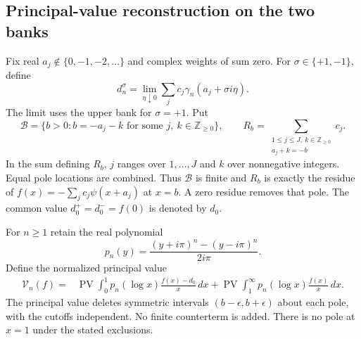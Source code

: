 \subsection{Principal-value reconstruction on the two banks}
Fix real $a_j\notin\{0,-1,-2,\ldots\}$ and complex weights of sum
zero. For $\sigma\in\{+1,-1\}$, define
\[
 d_n^\sigma=\lim_{\eta\downarrow0}\sum_jc_j\gamma_n(a_j+\sigma i\eta).
\]
The limit uses the upper bank for $\sigma=+1$. Put
\[
 \mathcal B=\{b>0:b=-a_j-k\text{ for some }j,\ k\in\mathbb Z_{\ge0}\},
 \qquad R_b=\sum_{\substack{1\le j\le J,\ k\in\mathbb Z_{\ge0}\\a_j+k=-b}}c_j.
\]
In the sum defining $R_b$, $j$ ranges over $1,\ldots,J$ and $k$ over
nonnegative integers. Equal pole locations are combined. Thus
$\mathcal B$ is finite and $R_b$ is exactly the residue of
$f(x)=-\sum_jc_j\psi(x+a_j)$ at $x=b$. A zero residue removes that
pole. The common value $d_0^+=d_0^-=f(0)$ is denoted by $d_0$.

For $n\ge1$ retain the real polynomial
\[
 p_n(y)=\frac{(y+i\pi)^n-(y-i\pi)^n}{2i\pi}.
\]
Define the normalized principal value
\begin{align}
 \mathcal V_n(f)={}&\operatorname{PV}\int_0^1
 p_n(\log x)\frac{f(x)-d_0}{x}\,dx
 +\operatorname{PV}\int_1^\infty
 p_n(\log x)\frac{f(x)}x\,dx.\label{stcut:PV}
\end{align}
The principal value deletes symmetric intervals $(b-\epsilon,b+\epsilon)$
about each pole, with the cutoffs independent. No finite counterterm
is added. There is no pole at $x=1$ under the stated exclusions.


